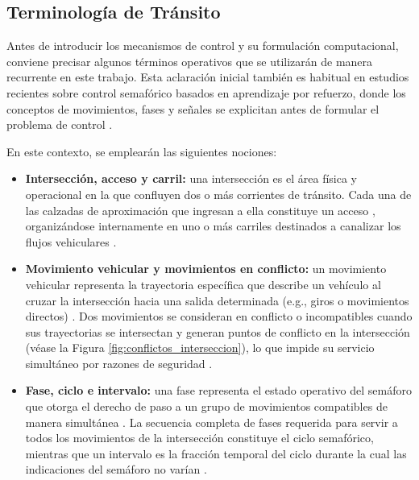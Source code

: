 \subsection{Terminología de Tránsito}

Antes de introducir los mecanismos de control y su formulación computacional, conviene precisar algunos términos operativos que se utilizarán de manera recurrente en este trabajo. Esta aclaración inicial también es habitual en estudios recientes sobre control semafórico basados en aprendizaje por refuerzo, donde los conceptos de movimientos, fases y señales se explicitan antes de formular el problema de control \cite{WeiH2019ASTSCM}.

En este contexto, se emplearán las siguientes nociones:

\begin{itemize}
    \item \textbf{Intersección, acceso y carril:} una intersección es el área física y operacional en la que confluyen dos o más corrientes de tránsito. Cada una de las calzadas de aproximación que ingresan a ella constituye un acceso \cite{ite_handbook}, organizándose internamente en uno o más carriles destinados a canalizar los flujos vehiculares \cite{calymayor}.
    \item \textbf{Movimiento vehicular y movimientos en conflicto:} un movimiento vehicular representa la trayectoria específica que describe un vehículo al cruzar la intersección hacia una salida determinada (e.g., giros o movimientos directos) \cite{WeiH2019ASTSCM}. Dos movimientos se consideran en conflicto o incompatibles cuando sus trayectorias se intersectan y generan puntos de conflicto en la intersección (véase la Figura \ref{fig:conflictos_interseccion}), lo que impide su servicio simultáneo por razones de seguridad \cite[Cap.~1]{fernandez}.
    \item \textbf{Fase, ciclo e intervalo:} una fase representa el estado operativo del semáforo que otorga el derecho de paso a un grupo de movimientos compatibles de manera simultánea \cite{ite_handbook}. La secuencia completa de fases requerida para servir a todos los movimientos de la intersección constituye el ciclo semafórico, mientras que un intervalo es la fracción temporal del ciclo durante la cual las indicaciones del semáforo no varían \cite{calymayor}.
\end{itemize}

